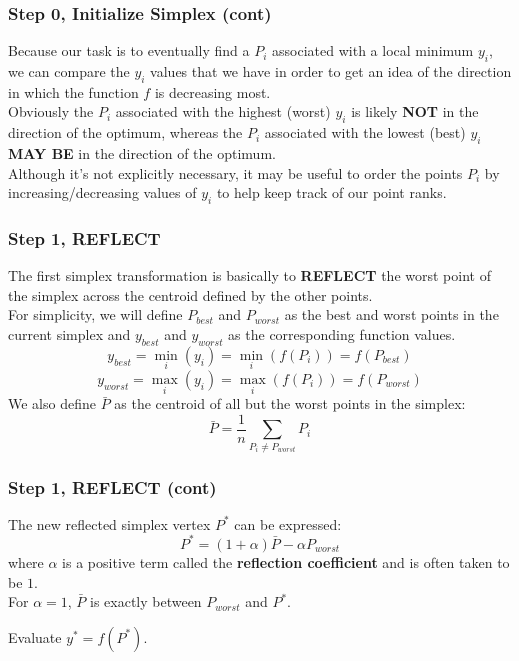 \documentclass[aspectratio=169]{beamer}
\begin{document}
	\begin{frame}
		\frametitle{Step 0, Initialize Simplex (cont)}
		Because our task is to eventually find a $P_i$ associated with a local minimum $y_i$, we can compare the $y_i$ values that we have in order to get an idea of the direction in which the function $f$ is decreasing most.  \\[\baselineskip] 
		Obviously the $P_i$ associated with the highest (worst) $y_i$ is likely \textbf{NOT} in the direction of the optimum, whereas the $P_i$ associated with the lowest (best) $y_i$ \textbf{MAY BE} in the direction of the optimum.
		\\[\baselineskip] 
		Although it's not explicitly necessary, it may be useful to order the points $P_i$ by increasing/decreasing values of $y_i$ to help keep track of our point ranks.
	\end{frame}


	\begin{frame}
		\frametitle{Step 1, REFLECT}
		The first simplex transformation is basically to \textbf{REFLECT} the worst point of the simplex across the centroid defined by the other points. 
		\\[\baselineskip] 
		For simplicity, we will define $P_{best}$ and $P_{worst}$ as the best and worst points in the current simplex and $y_{best}$ and $y_{worst}$ as the corresponding function values.
		$$y_{best}=\min_{i} (y_i) = \min_{i} (f(P_i))  = f(P_{best})$$
		$$y_{worst}=\max_{i} (y_i) = \max_{i} (f(P_i)) = f(P_{worst})$$
		We also define $\bar{P}$ as the centroid of all but the worst points in the simplex:
		$$ \bar{P}=\frac{1}{n}\sum_{P_i\neq P_{worst}}P_i $$
	\end{frame}
	
	\begin{frame}
		\frametitle{Step 1, REFLECT (cont)}
		The new reflected simplex vertex $P^*$ can be expressed:
		$$P^*=(1+\alpha)\bar{P}-\alpha P_{worst} $$
		where $\alpha$ is a positive term called the \textbf{reflection coefficient} and is often taken to be $1$.
		\\[\baselineskip] 
		For $\alpha=1$, $\bar{P}$ is exactly between $P_{worst}$ and $P^*$. 
		\\[\baselineskip] 
		\begin{center}
		\end{center}
	Evaluate $y^*=f(P^*)$.
	\end{frame}
	
\end{document}
